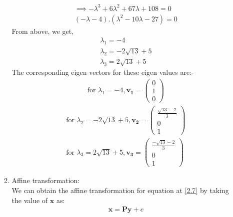 \documentclass[journal,12pt,twocolumn]{IEEEtran}
\let\vec\mathbf
\numberwithin{equation}{subsection}
\newcommand{\myvec}[1]{\ensuremath{\begin{pmatrix}#1\end{pmatrix}}}
\begin{document}
\begin{enumerate}
\begin{enumerate}
\begin{align}
\implies -\lambda^3 + 6\lambda^2 + 67\lambda + 108 =0 \\
(-\lambda-4).(\lambda^2 -10\lambda -27) = 0
\end{align}
From above, we get,
\begin{align}
\lambda_1 = -4\\
\lambda_2=-2\sqrt{13} + 5\\
\lambda_3=2\sqrt{13} + 5
\end{align}
The corresponding eigen vectors for these eigen values are:-
\begin{align}
\text{for } \lambda_1 = -4 ,\vec{ v_1} = \myvec{0\\1\\0}
\end{align}
\begin{align}
\text{for } \lambda_2=-2\sqrt{13} + 5 , \vec{ v_2}= \myvec{\frac{\sqrt{13} -2}{3}\\0\\1}\\
\text{for } \lambda_3=2\sqrt{13} + 5 , \vec{ v_3} = \myvec{\frac{-\sqrt{13} -2}{3}\\0\\1}
\end{align}

\item Affine transformation:\\
We can obtain the affine transformation for equation at \eqref{2.7} by taking the value of $\vec{x}$ as:
\begin{align}
\vec{x} = \vec{P}\vec{y} + c 
\end{align}


\end{enumerate}
\end{enumerate}
\end{document}
